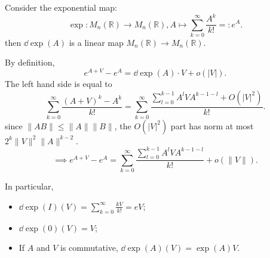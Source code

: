 \begin{example}
    Consider the exponential map:
	\[
	\exp: M_n(\mathbb{R}) \to M_n(\mathbb{R}),
	A \mapsto \sum_{k=0}^{\infty} \frac{A^k}{k!} =: e^A.
	\]
	then $\dd \exp (A)$ is a linear map $M_n(\mathbb{R})\to M_n(\mathbb{R})$.

	By definition,
	\[
	e^{A+V} - e^A = \dd \exp(A)\cdot V + o(|V|).
	\]
	The left hand side is equal to
	\[
	\sum_{k=0}^{\infty}\frac{(A+V)^k - A^k}{k!}
	= \sum_{k=0}^{\infty} \frac{\sum_{l=0}^{k-1} A^lVA^{k-1-l}+O(|V|^2)}{k!}.
	\]
	since $\lVert AB \rVert \le \lVert A \rVert \lVert B \rVert$,
	the $O(|V|^2)$ part has norm
	at most $2^k \lVert V \rVert ^2\lVert A \rVert ^{k-2}$.
	\[
	\implies e^{A+V} - e^A =
	\sum_{k=0}^{\infty} \frac{\sum_{l=0}^{k-1} A^lVA^{k-1-l}}{k!}
	+ o(\lVert V \rVert).
	\]

	In particular,
	\begin{itemize}
		\item $\dd \exp(I)(V) = \sum_{k=0}^{\infty} \frac{kV}{k!} = eV$;
		\item $\dd \exp (0)(V) = V$;
		\item If  $A$ and $V$ is commutative,
			$\dd\exp(A)(V) = \exp(A)V$.
	\end{itemize}
\end{example}

